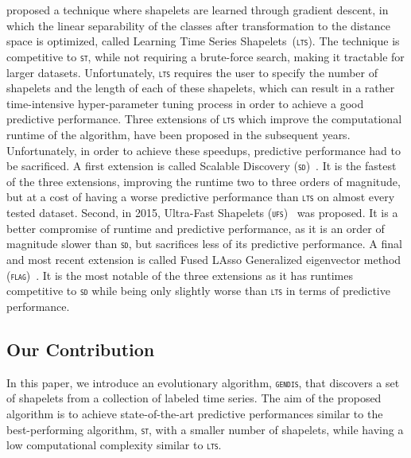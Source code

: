 \documentclass[runningheads]{llncs}
\begin{document}
\cite{grabocka2014learning} proposed a technique where shapelets are learned through gradient descent, in which the linear separability of the classes after transformation to the distance space is optimized, called Learning Time Series Shapelets~(\textsc{\texttt{lts}}). The technique is competitive to \textsc{\texttt{st}}, while not requiring a brute-force search, making it tractable for larger datasets. Unfortunately, \textsc{\texttt{lts}} requires the user to specify the number of shapelets and the length of each of these shapelets, which can result in a rather time-intensive hyper-parameter tuning process in order to achieve a good predictive performance. Three extensions of \texttt{\textsc{lts}} which improve the computational runtime of the algorithm, have been proposed in the subsequent years. Unfortunately, in order to achieve these speedups, predictive performance had to be sacrificed. A first extension is called Scalable Discovery (\texttt{\textsc{sd}})~\citep{grabocka2015scalable}. It is the fastest of the three extensions, improving the runtime two to three orders of magnitude, but at a cost of having a worse predictive performance than \texttt{\textsc{lts}} on almost every tested dataset. Second, in 2015, Ultra-Fast Shapelets (\texttt{\textsc{ufs}})~\citep{wistuba2015ultra} was proposed. It is a better compromise of runtime and predictive performance, as it is an order of magnitude slower than \texttt{\textsc{sd}}, but sacrifices less of its predictive performance. A final and most recent extension is called Fused LAsso Generalized eigenvector method (\texttt{\textsc{flag}})~\citep{hou2016efficient}. It is the most notable of the three extensions as it has runtimes competitive to \texttt{\textsc{sd}} while being only slightly worse than \texttt{\textsc{lts}} in terms of predictive performance. 

\subsection{Our Contribution}
In this paper, we introduce an evolutionary algorithm, \textsc{\texttt{gendis}}, that discovers a set of shapelets from a collection of labeled time series. The aim of the proposed algorithm is to achieve state-of-the-art predictive performances similar to the best-performing algorithm, \textsc{\texttt{st}}, with a smaller number of shapelets, while having a low computational complexity similar to \textsc{\texttt{lts}}. \\
\end{document}
